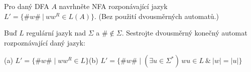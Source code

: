\documentclass[a4paper,12pt]{amsart}
\begin{document}
\begin{problem}
    
    Pro daný DFA $A$ navrhněte NFA rozponávající jazyk $L'=\{\#w\#\ |\ ww^R\in L(A)\}$. (Bez použití dvousměrných automatů.)

\end{problem}


\begin{problem}
    
    Buď $L$ regulární jazyk nad $\Sigma$ a $\#\notin\Sigma$. Sestrojte dvousměrný konečný automat rozpoznávající daný jazyk: 
    
    (a) $L' = \{\#w\#\mid ww^R \in L\}$\hfill (b) $L' = \{\#w\#\mid (\exists u \in\Sigma^*)\, wu \in L\ \& \ |w|=|u|\}$

\end{problem}
\end{document}
